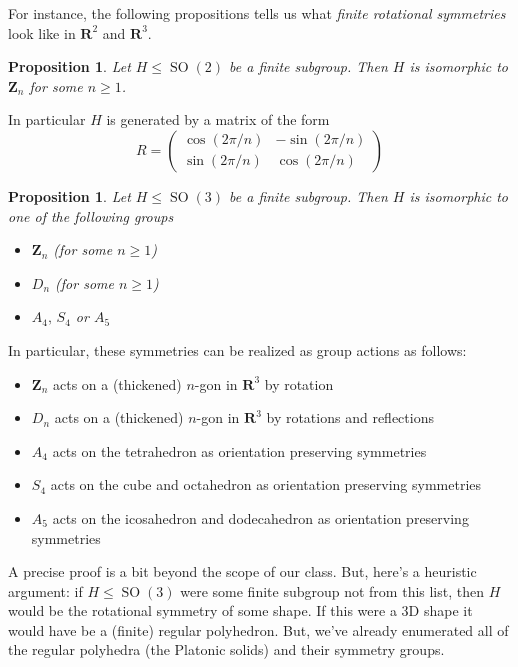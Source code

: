\documentclass[12pt]{article}
\numberwithin{equation}{subsection}
\newtheorem{prop}[subsection]{Proposition}
\theoremstyle{note}
\newcommand{\SO}{\operatorname{SO}}
\begin{document}
For instance, the following propositions tells us what \textit{finite rotational symmetries} look like in $\mathbf{R}^2$ and $\mathbf{R}^3$. 


\begin{prop}
	Let $H\leq \SO(2)$ be a finite subgroup. Then $H$ is isomorphic to $\mathbf{Z}_n$ for some $n\geq 1$.
\end{prop}

In particular $H$ is generated by a matrix of the form \[ R=\begin{pmatrix} \cos(2\pi/n) & -\sin(2\pi/n) \\ \sin(2\pi/n) & \cos(2\pi/n) \end{pmatrix} \]

\begin{prop}
	Let $H\leq \SO(3)$ be a finite subgroup. Then $H$ is isomorphic to one of the following groups \begin{itemize}
		\item $\mathbf{Z}_n$ (for some $n\geq 1$)
		\item $D_n$ (for some $n\geq 1$)
		\item $A_4, \, S_4$ or $A_5$
	\end{itemize}
\end{prop}

In particular, these symmetries can be realized as group actions as follows: \begin{itemize}
	\item $\mathbf{Z}_n$ acts on a (thickened) $n$-gon in $\mathbf{R}^3$ by rotation 
	\item $D_n$ acts on a (thickened) $n$-gon in $\mathbf{R}^3$ by rotations and reflections
	\item $A_4$ acts on the tetrahedron as orientation preserving symmetries
	\item $S_4$ acts on the cube and octahedron as orientation preserving symmetries
	\item $A_5$ acts on the icosahedron and dodecahedron as orientation preserving symmetries
\end{itemize}

A precise proof is a bit beyond the scope of our class. But, here's a heuristic argument: if $H\leq \SO(3)$ were some finite subgroup not from this list, then $H$ would be the rotational symmetry of some shape. If this were a 3D shape it would have be a (finite) regular polyhedron. But, we've already enumerated all of the regular polyhedra (the Platonic solids) and their symmetry groups. 
\end{document}

